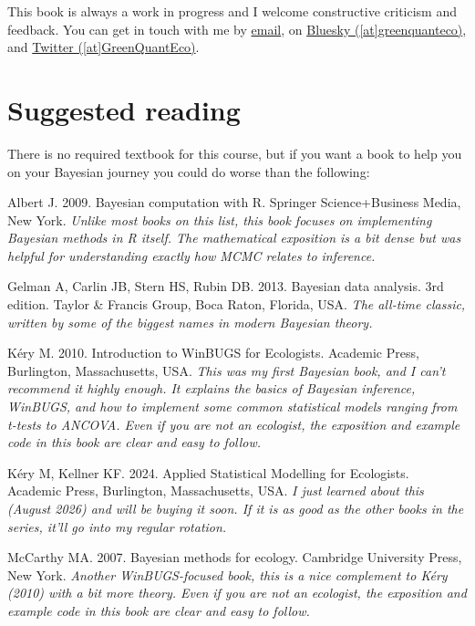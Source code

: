 \documentclass[
  13,
  letterpaper,
]{report}
\begin{document}

This book is always a work in progress and I welcome constructive
criticism and feedback. You can get in touch with me by
\href{mailto:ngreen62@kennesaw.edu}{email}, on
\href{https://bsky.app/profile/greenquanteco.bsky.social}{Bluesky
({[}at{]}greenquanteco)}, and \href{https://x.com/GreenQuantEco}{Twitter
({[}at{]}GreenQuantEco)}.

\section*{Suggested reading}\label{suggested-reading}


There is no required textbook for this course, but if you want a book to
help you on your Bayesian journey you could do worse than the following:

Albert J. 2009. Bayesian computation with R. Springer Science+Business
Media, New York. \emph{Unlike most books on this list, this book focuses
on implementing Bayesian methods in R itself. The mathematical
exposition is a bit dense but was helpful for understanding exactly how
MCMC relates to inference.}

Gelman A, Carlin JB, Stern HS, Rubin DB. 2013. Bayesian data analysis.
3rd edition. Taylor \& Francis Group, Boca Raton, Florida, USA.
\emph{The all-time classic, written by some of the biggest names in
modern Bayesian theory.}

Kéry M. 2010. Introduction to WinBUGS for Ecologists. Academic Press,
Burlington, Massachusetts, USA. \emph{This was my first Bayesian book,
and I can't recommend it highly enough. It explains the basics of
Bayesian inference, WinBUGS, and how to implement some common
statistical models ranging from t-tests to ANCOVA. Even if you are not
an ecologist, the exposition and example code in this book are clear and
easy to follow.}

Kéry M, Kellner KF. 2024. Applied Statistical Modelling for Ecologists.
Academic Press, Burlington, Massachusetts, USA. \emph{I just learned
about this (August 2026) and will be buying it soon. If it is as good as
the other books in the series, it'll go into my regular rotation.}

McCarthy MA. 2007. Bayesian methods for ecology. Cambridge University
Press, New York. \emph{Another WinBUGS-focused book, this is a nice
complement to Kéry (2010) with a bit more theory. Even if you are not an
ecologist, the exposition and example code in this book are clear and
easy to follow.}
\end{document}

